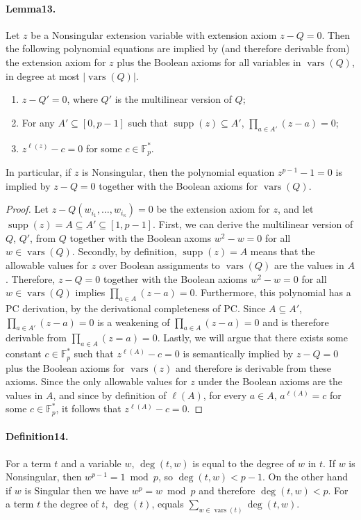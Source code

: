 \documentclass[10pt,a4paper]{article}
\DeclareMathOperator{\supp}{supp}
\DeclareMathOperator{\vars}{vars}
\begin{document}
\paragraph{Lemma13.} Let $z$ be a Nonsingular extension variable with extension axiom $z-Q=0$. Then the following polynomial equations are implied by (and therefore derivable from) the extension axiom for $z$ plus the Boolean axioms for all variables in $\vars(Q)$, in degree at most $|\vars(Q)|$.
\begin{enumerate}
\item $z-Q'=0$, where $Q'$ is the multilinear version of $Q$;
\item For any $A'\subseteq[0,p-1]$ such that $\supp(z)\subseteq A'$, $\prod_{a\in A'}(z-a)=0$;
\item $z^{\ell(z)}-c=0$ for some $c\in\mathbb F_p^*$.
\end{enumerate}
In particular, if $z$ is Nonsingular, then the polynomial equation $z^{p-1}-1=0$ is implied by $z-Q=0$ together with the Boolean axioms for $\vars(Q)$.
\begin{proof}
Let $z-Q(w_{i_1},\ldots,w_{i_{\kappa}})=0$ be the extension axiom for $z$, and let $\supp(z)=A\subseteq A'\subseteq[1,p-1]$. First, we can derive the multilinear version of $Q$, $Q'$, from $Q$ together with the Boolean axoms $w^2-w=0$ for all $w\in\vars(Q)$. Secondly, by definition, $\supp(z)=A$ means that the allowable values for $z$ over Boolean assignments to $\vars(Q)$ are the values in $A$. Therefore, $z-Q=0$ together with the Boolean axioms $w^2-w=0$ for all $w\in\vars(Q)$ implies $\prod_{a\in A}(z-a)=0$. Furthermore, this polynomial has a PC derivation, by the derivational completeness of PC. Since $A\subseteq A'$, $\prod_{a\in A'}(z-a)=0$ is a weakening of $\prod_{a\in A}(z-a)=0$ and is therefore derivable from $\prod_{a\in A}(z=a)=0$. Lastly, we will argue that there exists some constant $c\in\mathbb F_p^*$ such that $z^{\ell(A)}-c=0$ is semantically implied by $z-Q=0$ plus the Boolean axioms for $\vars(z)$ and therefore is derivable from these axioms. Since the only allowable values for $z$ under the Boolean axioms are the values in $A$, and since by definition of $\ell(A)$, for every $a\in A$, $a^{\ell(A)}=c$ for some $c\in\mathbb F_p^*$, it follows that $z^{\ell(A)}-c=0$.
\end{proof}
\paragraph{Definition14.} For a term $t$ and a variable $w$, $\deg(t,w)$ is equal to the degree of $w$ in $t$. If $w$ is Nonsingular, then $w^{p-1}=1\bmod p$, so $\deg(t,w)<p-1$. On the other hand if $w$ is Singular then we have $w^p=w\bmod p$ and therefore $\deg(t,w)<p$. For a term $t$ the degree of $t$, $\deg(t)$, equals $\sum_{w\in\vars(t)}\deg(t,w)$.
\end{document}
